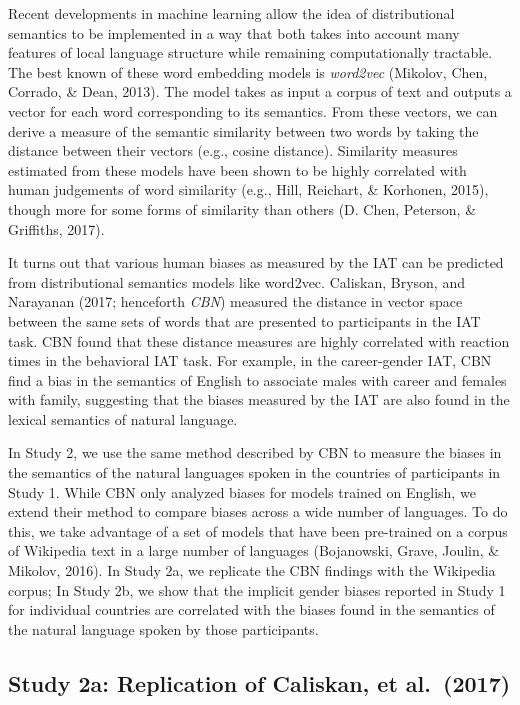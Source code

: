 \documentclass[10pt, letterpaper]{article}
\begin{document}
Recent developments in machine learning allow the idea of distributional
semantics to be implemented in a way that both takes into account many
features of local language structure while remaining computationally
tractable. The best known of these word embedding models is
\emph{word2vec} (Mikolov, Chen, Corrado, \& Dean, 2013). The model takes
as input a corpus of text and outputs a vector for each word
corresponding to its semantics. From these vectors, we can derive a
measure of the semantic similarity between two words by taking the
distance between their vectors (e.g., cosine distance). Similarity
measures estimated from these models have been shown to be highly
correlated with human judgements of word similarity (e.g., Hill,
Reichart, \& Korhonen, 2015), though more for some forms of similarity
than others (D. Chen, Peterson, \& Griffiths, 2017).

It turns out that various human biases as measured by the IAT can be
predicted from distributional semantics models like word2vec. Caliskan,
Bryson, and Narayanan (2017; henceforth \emph{CBN}) measured the
distance in vector space between the same sets of words that are
presented to participants in the IAT task. CBN found that these distance
measures are highly correlated with reaction times in the behavioral IAT
task. For example, in the career-gender IAT, CBN find a bias in the
semantics of English to associate males with career and females with
family, suggesting that the biases measured by the IAT are also found in
the lexical semantics of natural language.

In Study 2, we use the same method described by CBN to measure the
biases in the semantics of the natural languages spoken in the countries
of participants in Study 1. While CBN only analyzed biases for models
trained on English, we extend their method to compare biases across a
wide number of languages. To do this, we take advantage of a set of
models that have been pre-trained on a corpus of Wikipedia text in a
large number of languages (Bojanowski, Grave, Joulin, \& Mikolov, 2016).
In Study 2a, we replicate the CBN findings with the Wikipedia corpus; In
Study 2b, we show that the implicit gender biases reported in Study 1
for individual countries are correlated with the biases found in the
semantics of the natural language spoken by those participants.

\subsection{Study 2a: Replication of Caliskan, et
al.~(2017)}\label{study-2a-replication-of-caliskan-et-al.2017}
\end{document}
